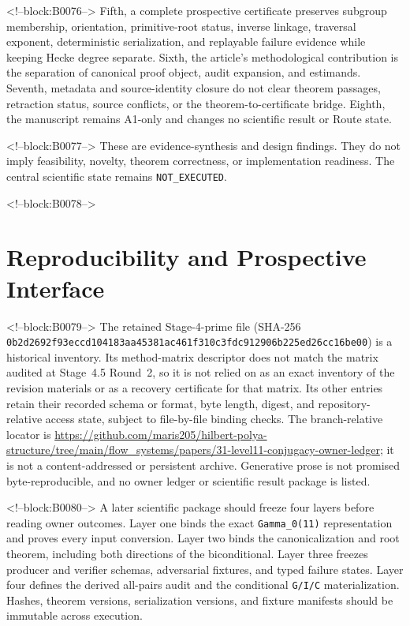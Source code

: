 \documentclass[11pt]{article}
\begin{document}
<!--block:B0076-->
Fifth, a complete prospective certificate preserves subgroup membership,
orientation, primitive-root status, inverse linkage, traversal exponent,
deterministic serialization, and replayable failure evidence while
keeping Hecke degree separate. Sixth, the article's methodological
contribution is the separation of canonical proof object, audit
expansion, and estimands. Seventh, metadata and source-identity closure
do not clear theorem passages, retraction status, source conflicts, or
the theorem-to-certificate bridge. Eighth, the manuscript remains A1-only
and changes no scientific result or Route state.

<!--block:B0077-->
These are evidence-synthesis and design findings. They do not imply
feasibility, novelty, theorem correctness, or implementation readiness.
The central scientific state remains \texttt{NOT\_EXECUTED}.

<!--block:B0078-->
\hypertarget{6-reproducibility-and-prospective-interface}{%
\section{Reproducibility and Prospective
Interface}\label{6-reproducibility-and-prospective-interface}}

<!--block:B0079-->
\begingroup\sloppy
The retained Stage-4-prime file
 (SHA-256
\texttt{0b2d2692f93eccd1\allowbreak{}04183aa45381ac46\allowbreak{}1f310c3fdc912906\allowbreak{}b225ed26cc16be00})
is a historical inventory. Its method-matrix descriptor does not match the
matrix audited at Stage~4.5 Round~2, so it is not relied on as an exact inventory
of the revision materials or as a recovery certificate for that matrix. Its
other entries retain their recorded schema or format, byte length, digest, and
repository-relative access state, subject to file-by-file binding checks. The
branch-relative locator is
\url{https://github.com/maris205/hilbert-polya-structure/tree/main/flow_systems/papers/31-level11-conjugacy-owner-ledger};
it is not a content-addressed or persistent archive. Generative prose is not
promised byte-reproducible, and no owner ledger or scientific result package
is listed.
\par\endgroup

<!--block:B0080-->
A later scientific package should freeze four layers before reading
owner outcomes. Layer one binds the exact \texttt{Gamma\_0(11)}
representation and proves every input conversion. Layer two binds the
canonicalization and root theorem, including both directions of the
biconditional. Layer three freezes producer and verifier schemas,
adversarial fixtures, and typed failure states. Layer four defines the
derived all-pairs audit and the conditional \texttt{G/I/C}
materialization. Hashes, theorem versions, serialization versions, and
fixture manifests should be immutable across execution.
\end{document}
